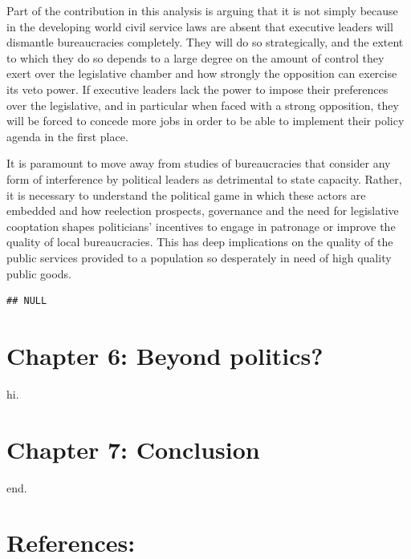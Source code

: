 \documentclass[12pt,]{article}
\begin{document}
Part of the contribution in this analysis is arguing that it is not
simply because in the developing world civil service laws are absent
that executive leaders will dismantle bureaucracies completely. They
will do so strategically, and the extent to which they do so depends to
a large degree on the amount of control they exert over the legislative
chamber and how strongly the opposition can exercise its veto power. If
executive leaders lack the power to impose their preferences over the
legislative, and in particular when faced with a strong opposition, they
will be forced to concede more jobs in order to be able to implement
their policy agenda in the first place.

It is paramount to move away from studies of bureaucracies that consider
any form of interference by political leaders as detrimental to state
capacity. Rather, it is necessary to understand the political game in
which these actors are embedded and how reelection prospects, governance
and the need for legislative cooptation shapes politicians' incentives
to engage in patronage or improve the quality of local bureaucracies.
This has deep implications on the quality of the public services
provided to a population so desperately in need of high quality public
goods.

\begin{verbatim}
## NULL
\end{verbatim}

\pagebreak

\hypertarget{chapter-6-beyond-politics}{%
\section{Chapter 6: Beyond politics?}\label{chapter-6-beyond-politics}}

hi.

\pagebreak

\hypertarget{chapter-7-conclusion}{%
\section{Chapter 7: Conclusion}\label{chapter-7-conclusion}}

end.

\hypertarget{references}{%
\section*{References:}\label{references}}
\end{document}
